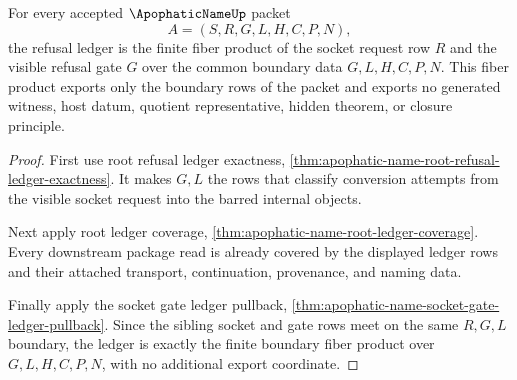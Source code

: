 \begin{theorem}
\label{thm:apophatic-name-refusal-ledger-fiber-product}
For every accepted $\ApophaticNameUp$ packet
$$
A=(S,R,G,L,H,C,P,N),
$$
the refusal ledger is the finite fiber product of the socket request row $R$ and the visible refusal gate $G$ over the common boundary data $G,L,H,C,P,N$. This fiber product exports only the boundary rows of the packet and exports no generated witness, host datum, quotient representative, hidden theorem, or closure principle.
\end{theorem}
\begin{proof}
First use root refusal ledger exactness, \autoref{thm:apophatic-name-root-refusal-ledger-exactness}. It makes $G,L$ the rows that classify conversion attempts from the visible socket request into the barred internal objects.

Next apply root ledger coverage, \autoref{thm:apophatic-name-root-ledger-coverage}. Every downstream package read is already covered by the displayed ledger rows and their attached transport, continuation, provenance, and naming data.

Finally apply the socket gate ledger pullback, \autoref{thm:apophatic-name-socket-gate-ledger-pullback}. Since the sibling socket and gate rows meet on the same $R,G,L$ boundary, the ledger is exactly the finite boundary fiber product over $G,L,H,C,P,N$, with no additional export coordinate.
\end{proof}

